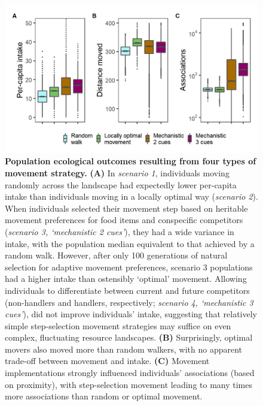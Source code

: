 \begin{interludeenv}
\begin{figure}[!h]
    \centering
    \includegraphics[width=0.95\linewidth]{figures/introduction/fig_case_study_ecological_outcomes.png}
    \caption{
        \textbf{Population ecological outcomes resulting from four types of movement strategy.}
        \textbf{(A)} In \textit{scenario 1}, individuals moving randomly across the landscape had expectedly lower per-capita intake than individuals moving in a locally optimal way (\textit{scenario 2}).
        When individuals selected their movement step based on heritable movement preferences for food items and conspecific competitors (\textit{scenario 3, `mechanistic 2 cues'}), they had a wide variance in intake, with the population median equivalent to that achieved by a random walk.
        However, after only 100 generations of natural selection for adaptive movement preferences, scenario 3 populations had a higher intake than ostensibly `optimal' movement.
        Allowing individuals to differentiate between current and future competitors (non-handlers and handlers, respectively; \textit{scenario 4, `mechanistic 3 cues'}), did not improve individuals' intake, suggesting that relatively simple step-selection movement strategies may suffice on even complex, fluctuating resource landscapes.
        \textbf{(B)} Surprisingly, optimal movers also moved more than random walkers, with no apparent trade-off between movement and intake.
        \textbf{(C)} Movement implementations strongly influenced individuals' associations (based on proximity), with step-selection movement leading to many times more associations than random or optimal movement.
    }
    \label{fig:demo_compare}
    \end{figure}


\end{interludeenv}
